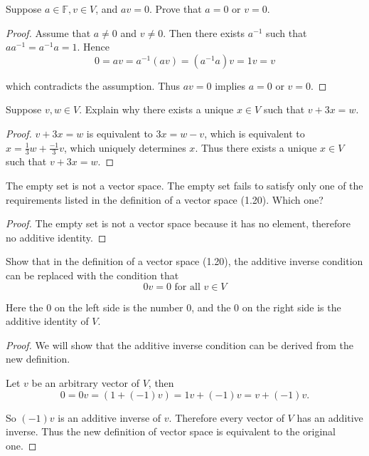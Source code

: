 \begin{exercise}
    Suppose $a\in\mathbb{F}, v\in V$, and $av = 0$. Prove that $a = 0$ or $v = 0$.
\end{exercise}

\begin{proof}
    Assume that $a\ne 0$ and $v\ne 0$. Then there exists $a^{-1}$ such that $aa^{-1} = a^{-1}a = 1$. Hence
    \[
        0 = av = a^{-1}(av) = (a^{-1}a)v = 1v = v
    \]

    which contradicts the assumption. Thus $av = 0$ implies $a = 0$ or $v = 0$.
\end{proof}

\begin{exercise}
    Suppose $v, w\in V$. Explain why there exists a unique $x\in V$ such that $v + 3x = w$.
\end{exercise}

\begin{proof}
    $v + 3x = w$ is equivalent to $3x = w - v$, which is equivalent to $x = \frac{1}{3}w + \frac{-1}{3}v$, which uniquely determines $x$. Thus there exists a unique $x\in V$ such that $v + 3x = w$.
\end{proof}

\begin{exercise}
    The empty set is not a vector space. The empty set fails to satisfy only one of the requirements listed in the definition of a vector space (1.20). Which one?
\end{exercise}

\begin{proof}
    The empty set is not a vector space because it has no element, therefore no additive identity.
\end{proof}

\begin{exercise}
    Show that in the definition of a vector space (1.20), the additive inverse condition can be replaced with the condition that
    \[
        0v = 0\text{ for all }v\in V
    \]

    Here the $0$ on the left side is the number $0$, and the $0$ on the right side is the additive identity of $V$.
\end{exercise}

\begin{proof}
    We will show that the additive inverse condition can be derived from the new definition.

    Let $v$ be an arbitrary vector of $V$, then
    \[
        0 = 0v = (1 + (-1)v) = 1v + (-1)v = v + (-1)v.
    \]

    So $(-1)v$ is an additive inverse of $v$. Therefore every vector of $V$ has an additive inverse. Thus the new definition of vector space is equivalent to the original one.
\end{proof}

